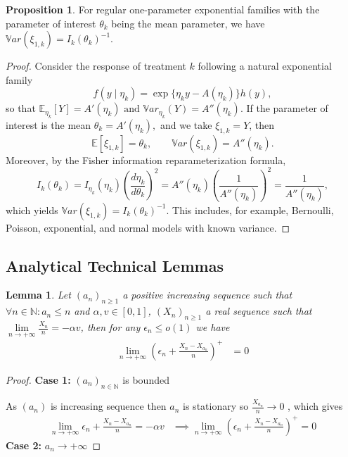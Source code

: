 \documentclass[11pt]{article}
\theoremstyle{plain}
\newtheorem{lemma}[theorem]{Lemma}
\theoremstyle{definition}
\newtheorem{proposition}[theorem]{Proposition}
\begin{document}
\begin{appendix}
\begin{proposition}\label{prop:exp-fam}
	For regular one-parameter exponential families with the parameter of interest $\theta_k$ being the mean parameter, we have $\mathbb{V}ar(\xi_{1,k}) = I_k(\theta_k)^{-1}$.
\end{proposition}
\begin{proof}
	Consider the response of treatment $k$ following a natural exponential family
	\[
	f(y \mid \eta_k)
	=
	\exp\{\eta_k y - A(\eta_k)\} h(y),
	\]
	so that \(\mathbb{E}_{\eta_k}[Y] = A'(\eta_k) \text{ and }
	\mathbb{V}ar_{\eta_k}(Y) = A''(\eta_k).\) If the parameter of interest is the mean \(\theta_k = A'(\eta_k),\)
	and we take $\xi_{1,k}=Y$, then
	\[
	\mathbb{E}[\xi_{1,k}] = \theta_k,
	\qquad
	\mathbb{V}ar(\xi_{1,k}) = A''(\eta_k).
	\]
	Moreover, by the Fisher information reparameterization formula,
	\[
	I_k(\theta_k)
	=
	I_{\eta_k}(\eta_k)
	\left(\frac{d\eta_k}{d\theta_k}\right)^2
	=
	A''(\eta_k)\left(\frac{1}{A''(\eta_k)}\right)^2
	=
	\frac{1}{A''(\eta_k)},
	\]
	which yields \(\mathbb{V}ar(\xi_{1,k}) = I_k(\theta_k)^{-1}.\)
	This includes, for example, Bernoulli, Poisson, exponential, and normal models with known variance.
\end{proof}

\subsection{Analytical Technical Lemmas}
\begin{lemma}\label{lem:convergence}
	Let $(a_n)_{n \geq 1}$ a positive increasing sequence such that $\forall n \in \mathbb{N}: a_n \leq n$ and $\alpha, v \in [0,1]$, $(X_n)_{n \geq 1}$ a real sequence such that $\lim\limits_{n \to +\infty} \frac{X_n}{n} = -\alpha v$, then for any \(\epsilon_n \leq o(1)\) we have
\begin{align*}
		\lim\limits_{n \to +\infty}\left( \epsilon_n + \frac{X_n - X_{a_n}}{n} \right)^+ &= 0 
\end{align*}
\end{lemma}

\begin{proof}	
	\textbf{Case 1:} $(a_n)_{n \in \mathbb{N}}$ is bounded
	
	As \((a_n)\) is increasing sequence then \(a_n\) is stationary so \(\frac{X_{a_n}}{n} \longrightarrow 0\) , which gives
	\begin{align*}
		\lim_{n \to +\infty} \epsilon_n + \frac{X_n - X_{a_n}}{n} = -\alpha v
		&\implies \lim_{n \to +\infty} \left(\epsilon_n + \frac{X_n - X_{a_n}}{n}\right)^+ = 0
	\end{align*}	
	\textbf{Case 2:} $a_n \to +\infty$
	

\end{proof}
\end{appendix}
\end{document}
